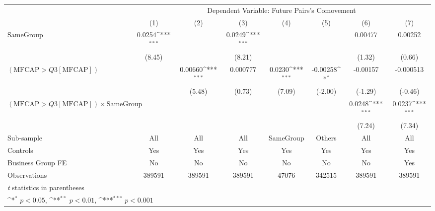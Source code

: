 {
\def\sym#1{\ifmmode^{#1}\else\(^{#1}\)\fi}
\begin{tabular}{l*{7}{c}}
\hline\hline
                &\multicolumn{7}{c}{Dependent Variable:  Future Pairs's Comovement}                                                                  \\\cmidrule(lr){2-8}
                &\multicolumn{1}{c}{(1)}         &\multicolumn{1}{c}{(2)}         &\multicolumn{1}{c}{(3)}         &\multicolumn{1}{c}{(4)}         &\multicolumn{1}{c}{(5)}         &\multicolumn{1}{c}{(6)}         &\multicolumn{1}{c}{(7)}         \\
\hline
SameGroup       &   0.0254\sym{***}&                  &   0.0249\sym{***}&                  &                  &  0.00477         &  0.00252         \\
                &   (8.45)         &                  &   (8.21)         &                  &                  &   (1.32)         &   (0.66)         \\
[1em]
$ (\text{MFCAP} > Q3[\text{MFCAP}]) $ &                  &  0.00660\sym{***}& 0.000777         &   0.0230\sym{***}& -0.00258\sym{*}  & -0.00157         &-0.000513         \\
                &                  &   (5.48)         &   (0.73)         &   (7.09)         &  (-2.00)         &  (-1.29)         &  (-0.46)         \\
[1em]
 $ (\text{MFCAP} > Q3[\text{MFCAP}]) \times {\text{SameGroup}} $ &                  &                  &                  &                  &                  &   0.0248\sym{***}&   0.0237\sym{***}\\
                &                  &                  &                  &                  &                  &   (7.24)         &   (7.34)         \\
\hline
Sub-sample      &      All         &      All         &      All         &SameGroup         &   Others         &      All         &      All         \\
Controls        &      Yes         &      Yes         &      Yes         &      Yes         &      Yes         &      Yes         &      Yes         \\
Business Group FE&       No         &       No         &       No         &       No         &       No         &       No         &      Yes         \\
Observations    &   389591         &   389591         &   389591         &    47076         &   342515         &   389591         &   389591         \\
\hline\hline
\multicolumn{8}{l}{\footnotesize \textit{t} statistics in parentheses}\\
\multicolumn{8}{l}{\footnotesize \sym{*} \(p<0.05\), \sym{**} \(p<0.01\), \sym{***} \(p<0.001\)}\\
\end{tabular}
}
